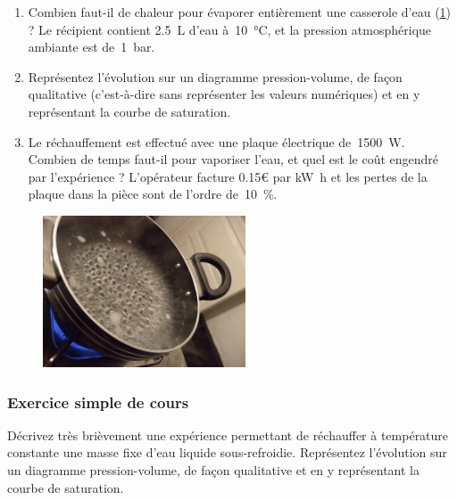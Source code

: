 	\begin{enumerate}
		\item Combien faut-il de chaleur pour évaporer entièrement une casserole d’eau (\cref{fig_casserole_eau}) ? Le récipient contient \SI{2.5}{\liter} d’eau à~\SI{10}{\degreeCelsius}, et la pression atmosphérique ambiante est de~\SI{1}{\bar}.
		\item Représentez l’évolution sur un diagramme pression-volume, de façon qualitative (c’est-à-dire sans représenter les valeurs numériques) et en y représentant la courbe de saturation.
		\item Le réchauffement est effectué avec une plaque électrique de~\SI{1500}{\watt}. Combien de temps faut-il pour vaporiser l’eau, et quel est le coût engendré par l’expérience ? L’opérateur facture \num{0,15}\euro{} par \si{\kilo\watt\hour} et les pertes de la plaque dans la pièce sont de l’ordre de~\SI{10}{\percent}.
	\end{enumerate}

	\begin{figure}[htp] %
		\begin{center}
			\includegraphics[width=6cm]{images/exercice_boiling.jpg}
		\end{center}
		\label{fig_casserole_eau}
	\end{figure}


\subsubsection{Exercice simple de cours}
\label{exo_cours_vapeur_isotherme}

	Décrivez très brièvement une expérience permettant de réchauffer à température constante une masse fixe d’eau liquide sous-refroidie. Représentez l’évolution sur un diagramme pression-volume, de façon qualitative et en y représentant la courbe de saturation.


